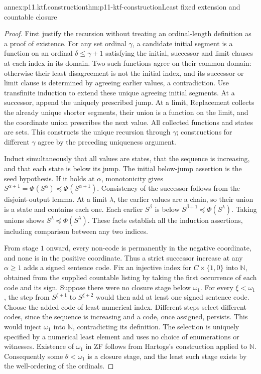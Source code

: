 \begin{annexitem}{annex:p11.ktf.construction}{thm:p11-ktf-construction}{Least fixed extension and countable closure}
\begin{proof}
First justify the recursion without treating an ordinal-length definition
as a proof of existence. For any set ordinal \(\gamma\), a candidate
initial segment is a function on an ordinal \(\delta\leq\gamma+1\)
satisfying the initial, successor and limit clauses at each index in its
domain. Two such functions agree on their common domain: otherwise their
least disagreement is not the initial index, and its successor or limit
clause is determined by agreeing earlier values, a contradiction. Use
transfinite induction to extend these unique agreeing initial segments.
At a successor, append the uniquely prescribed jump. At a limit,
Replacement collects the already unique shorter segments, their union
is a function on the limit, and the coordinate union prescribes the next
value. All collected functions and states are sets. This constructs the
unique recursion through \(\gamma\); constructions for different
\(\gamma\) agree by the preceding uniqueness argument.

Induct simultaneously that all values are states, that the sequence is
increasing, and that each state is below its jump. The initial below-jump
assertion is the seed hypothesis. If it holds at \(\alpha\), monotonicity
gives \(S^{\alpha+1}=\Phi(S^\alpha)\preceq
\Phi(S^{\alpha+1})\). Consistency of the successor follows from the
disjoint-output lemma. At a limit \(\lambda\), the earlier values are
a chain, so their union is a state and contains each one. Each earlier
\(S^\beta\) is below \(S^{\beta+1}\preceq\Phi(S^\lambda)\).
Taking unions shows \(S^\lambda\preceq\Phi(S^\lambda)\).
These facts establish all the induction assertions, including comparison
between any two indices.

From stage \(1\) onward, every non-code is permanently in the negative
coordinate, and none is in the positive coordinate. Thus a strict
successor increase at any \(\alpha\geq1\) adds a signed sentence
code. Fix an injective index for \(C\times\{1,0\}\) into
\(\mathbb N\), obtained from the supplied countable listing by taking
the first occurrence of each code and its sign. Suppose there were no
closure stage below \(\omega_1\). For every \(\xi<\omega_1\),
the step from \(S^{\xi+1}\) to \(S^{\xi+2}\) would then add at
least one signed sentence code. Choose the added code of least numerical
index. Different steps select different codes, since the sequence is
increasing and a code, once assigned, persists. This would inject
\(\omega_1\) into \(\mathbb N\), contradicting its definition.
The selection is uniquely specified by a numerical least element and
uses no choice of enumerations or witnesses. Existence of \(\omega_1\)
in ZF follows from Hartogs's construction applied to \(\mathbb N\).
Consequently some \(\theta<\omega_1\) is a closure stage, and the
least such stage exists by the well-ordering of the ordinals.


\end{proof}
\end{annexitem}
